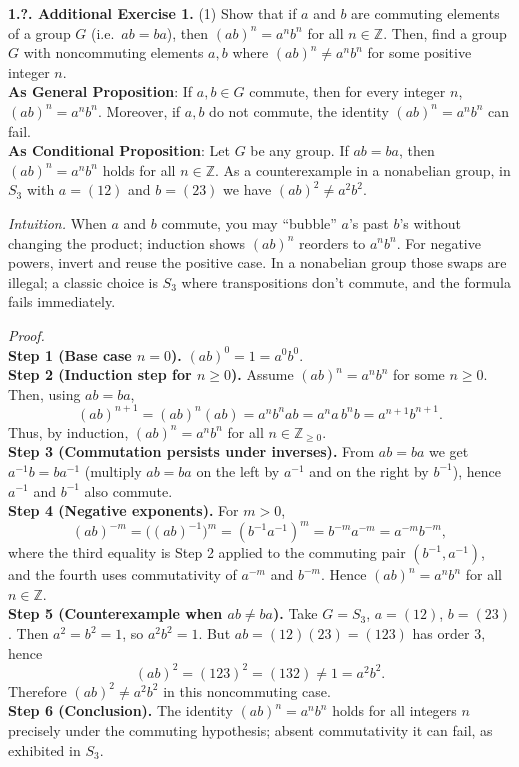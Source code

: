 \documentclass[12pt]{article}
\theoremstyle{definition}
\begin{document}
\newpage

\noindent \textbf{1.?. Additional Exercise 1.} 
(1) Show that if $a$ and $b$ are commuting elements of a group $G$ (i.e.\ $ab=ba$), then $(ab)^n=a^n b^n$ for all $n\in\mathbb{Z}$. 
Then, find a group $G$ with noncommuting elements $a,b$ where $(ab)^n\ne a^n b^n$ for some positive integer $n$.\\ %

\noindent\textbf{As General Proposition}: If $a,b\in G$ commute, then for every integer $n$, $(ab)^n=a^n b^n$. Moreover, if $a,b$ do not commute, the identity $(ab)^n=a^n b^n$ can fail.\\

\noindent \textbf{As Conditional Proposition}: Let $G$ be any group. If $ab=ba$, then $(ab)^n=a^n b^n$ holds for all $n\in\mathbb{Z}$. As a counterexample in a nonabelian group, in $S_3$ with $a=(12)$ and $b=(23)$ we have $(ab)^2\ne a^2 b^2$.\\

\newpage

\dotfill

\emph{Intuition.} When $a$ and $b$ commute, you may “bubble” $a$’s past $b$’s without changing the product; induction shows $(ab)^n$ reorders to $a^n b^n$. For negative powers, invert and reuse the positive case. In a nonabelian group those swaps are illegal; a classic choice is $S_3$ where transpositions don’t commute, and the formula fails immediately.\\

\dotfill

\emph{Proof.}\\
\textbf{Step 1 (Base case $n=0$).} $(ab)^0=1=a^0 b^0$.\\
\textbf{Step 2 (Induction step for $n\ge 0$).} Assume $(ab)^n=a^n b^n$ for some $n\ge 0$. Then, using $ab=ba$,
\[
(ab)^{n+1}=(ab)^n(ab)=a^n b^n ab=a^n a\, b^n b=a^{n+1} b^{n+1}.
\]
Thus, by induction, $(ab)^n=a^n b^n$ for all $n\in\mathbb{Z}_{\ge 0}$.\\
\textbf{Step 3 (Commutation persists under inverses).} From $ab=ba$ we get $a^{-1}b=b a^{-1}$ (multiply $ab=ba$ on the left by $a^{-1}$ and on the right by $b^{-1}$), hence $a^{-1}$ and $b^{-1}$ also commute.\\
\textbf{Step 4 (Negative exponents).} For $m>0$,
\[
(ab)^{-m}=\big((ab)^{-1}\big)^m=(b^{-1}a^{-1})^m
= b^{-m} a^{-m} = a^{-m} b^{-m},
\]
where the third equality is Step 2 applied to the commuting pair $(b^{-1},a^{-1})$, and the fourth uses commutativity of $a^{-m}$ and $b^{-m}$. Hence $(ab)^n=a^n b^n$ for all $n\in\mathbb{Z}$.\\
\textbf{Step 5 (Counterexample when $ab\ne ba$).} Take $G=S_3$, $a=(12)$, $b=(23)$. Then $a^2=b^2=1$, so $a^2 b^2=1$. But $ab=(12)(23)=(123)$ has order $3$, hence
\[
(ab)^2=(123)^2=(132)\ne 1=a^2 b^2.
\]
Therefore $(ab)^2\ne a^2 b^2$ in this noncommuting case.\\
\textbf{Step 6 (Conclusion).} The identity $(ab)^n=a^n b^n$ holds for all integers $n$ precisely under the commuting hypothesis; absent commutativity it can fail, as exhibited in $S_3$.
\end{document}
